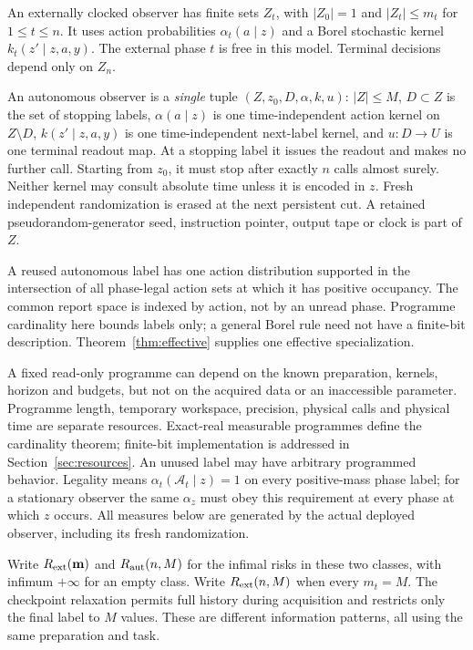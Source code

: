 \begin{definition}\label{def:machines}
An externally clocked observer has finite sets $Z_t$, with $|Z_0|=1$ and $|Z_t|\le m_t$ for $1\le t\le n$. It uses action probabilities $\alpha_t(a\mid z)$ and a Borel stochastic kernel $k_t(z'\mid z,a,y)$. The external phase $t$ is free in this model. Terminal decisions depend only on $Z_n$.

An autonomous observer is a \emph{single} tuple $(Z,z_0,D,\alpha,k,u)$: $|Z|\le M$, $D\subset Z$ is the set of stopping labels, $\alpha(a\mid z)$ is one time-independent action kernel on $Z\setminus D$, $k(z'\mid z,a,y)$ is one time-independent next-label kernel, and $u:D\to U$ is one terminal readout map. At a stopping label it issues the readout and makes no further call. Starting from $z_0$, it must stop after exactly $n$ calls almost surely. Neither kernel may consult absolute time unless it is encoded in $z$. Fresh independent randomization is erased at the next persistent cut. A retained pseudorandom-generator seed, instruction pointer, output tape or clock is part of $Z$.
\end{definition}
A reused autonomous label has one action distribution supported in the intersection of all phase-legal action sets at which it has positive occupancy. The common report space is indexed by action, not by an unread phase. Programme cardinality here bounds labels only; a general Borel rule need not have a finite-bit description. Theorem~\ref{thm:effective} supplies one effective specialization.

A fixed read-only programme can depend on the known preparation, kernels, horizon and budgets, but not on the acquired data or an inaccessible parameter. Programme length, temporary workspace, precision, physical calls and physical time are separate resources. Exact-real measurable programmes define the cardinality theorem; finite-bit implementation is addressed in Section~\ref{sec:resources}. An unused label may have arbitrary programmed behavior. Legality means $\alpha_t(\mathcal A_t\mid z)=1$ on every positive-mass phase label; for a stationary observer the same $\alpha_z$ must obey this requirement at every phase at which $z$ occurs. All measures below are generated by the actual deployed observer, including its fresh randomization.

Write $R_{\mathrm{ext}}(\mathbf m)$ and $R_{\mathrm{aut}}(n,M)$ for the infimal risks in these two classes, with infimum $+\infty$ for an empty class. Write $R_{\mathrm{ext}}(n,M)$ when every $m_t=M$. The checkpoint relaxation permits full history during acquisition and restricts only the final label to $M$ values. These are different information patterns, all using the same preparation and task.

